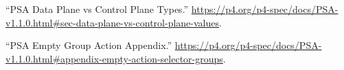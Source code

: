 \documentclass[11pt]{article}
\begin{document}
{{\begin{thebibliography}{38}
\mdbibitemlabel{{}[23]}\textquotedblleft{}PSA Data Plane vs Control Plane Types.\textquotedblright{} \href{https://p4.org/p4-spec/docs/PSA-v1.1.0.html\%23sec-data-plane-vs-control-plane-values}{{\ttfamily https://\hspace{0pt}p4.\hspace{0pt}org/\hspace{0pt}p4-\hspace{0pt}spec/\hspace{0pt}docs/\hspace{0pt}PSA-\hspace{0pt}v1.\hspace{0pt}1.\hspace{0pt}0.\hspace{0pt}html\#\hspace{0pt}sec-\hspace{0pt}data-\hspace{0pt}plane-\hspace{0pt}vs-\hspace{0pt}control-\hspace{0pt}plane-\hspace{0pt}values}}.\label{psatranslation}%

\mdbibitemlabel{{}[24]}\textquotedblleft{}PSA Empty Group Action Appendix.\textquotedblright{} \href{https://p4.org/p4-spec/docs/PSA-v1.1.0.html\%23appendix-empty-action-selector-groups}{{\ttfamily https://\hspace{0pt}p4.\hspace{0pt}org/\hspace{0pt}p4-\hspace{0pt}spec/\hspace{0pt}docs/\hspace{0pt}PSA-\hspace{0pt}v1.\hspace{0pt}1.\hspace{0pt}0.\hspace{0pt}html\#\hspace{0pt}appendix-\hspace{0pt}empty-\hspace{0pt}action-\hspace{0pt}selector-\hspace{0pt}groups}}.\label{psaemptygroupactionappendix}%


\end{thebibliography}}}
\end{document}
